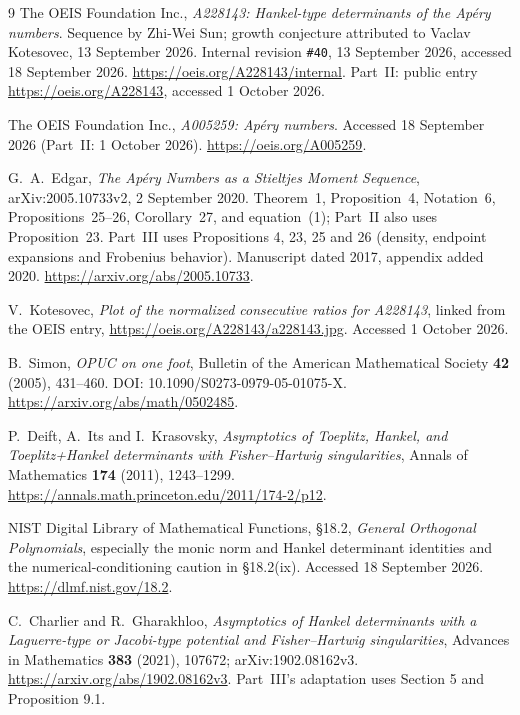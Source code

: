 \documentclass[11pt,a4paper]{article}
\numberwithin{equation}{section}
\theoremstyle{remark}\newtheorem{remark}[theorem]{Remark}
\begin{document}
\begin{thebibliography}{9}
The OEIS Foundation Inc., \emph{A228143: Hankel-type determinants of the
Ap\'ery numbers}. Sequence by Zhi-Wei Sun; growth conjecture attributed to
Vaclav Kotesovec, 13 September 2026. Internal revision \texttt{\#40},
13 September 2026, accessed 18 September 2026.
\url{https://oeis.org/A228143/internal}.
Part~II: public entry \url{https://oeis.org/A228143}, accessed 1 October 2026.

The OEIS Foundation Inc., \emph{A005259: Ap\'ery numbers}.
Accessed 18 September 2026 (Part~II: 1 October 2026).
\url{https://oeis.org/A005259}.

G.~A.~Edgar, \emph{The Ap\'ery Numbers as a Stieltjes Moment Sequence},
arXiv:2005.10733v2, 2 September 2020.
Theorem~1, Proposition~4, Notation~6, Propositions~25--26, Corollary~27,
and equation~(1); Part~II also uses Proposition~23. Part~III uses
Propositions 4, 23, 25 and 26 (density, endpoint expansions and Frobenius
behavior). Manuscript dated 2017, appendix added 2020.
\url{https://arxiv.org/abs/2005.10733}.

V.~Kotesovec, \emph{Plot of the normalized consecutive ratios for A228143},
linked from the OEIS entry,
\url{https://oeis.org/A228143/a228143.jpg}. Accessed 1 October 2026.

B.~Simon, \emph{OPUC on one foot},
Bulletin of the American Mathematical Society \textbf{42} (2005), 431--460.
DOI: 10.1090/S0273-0979-05-01075-X.
\url{https://arxiv.org/abs/math/0502485}.

P.~Deift, A.~Its and I.~Krasovsky,
\emph{Asymptotics of Toeplitz, Hankel, and Toeplitz+Hankel determinants with
Fisher--Hartwig singularities},
Annals of Mathematics \textbf{174} (2011), 1243--1299.
\url{https://annals.math.princeton.edu/2011/174-2/p12}.

NIST Digital Library of Mathematical Functions, \S18.2,
\emph{General Orthogonal Polynomials}, especially the monic norm and Hankel
determinant identities and the numerical-conditioning caution in \S18.2(ix).
Accessed 18 September 2026.
\url{https://dlmf.nist.gov/18.2}.

C.~Charlier and R.~Gharakhloo,
\emph{Asymptotics of Hankel determinants with a Laguerre-type or
Jacobi-type potential and Fisher--Hartwig singularities},
Advances in Mathematics \textbf{383} (2021), 107672;
arXiv:1902.08162v3.
\url{https://arxiv.org/abs/1902.08162v3}.
Part~III's adaptation uses Section 5 and Proposition 9.1.


\end{thebibliography}
\end{document}

